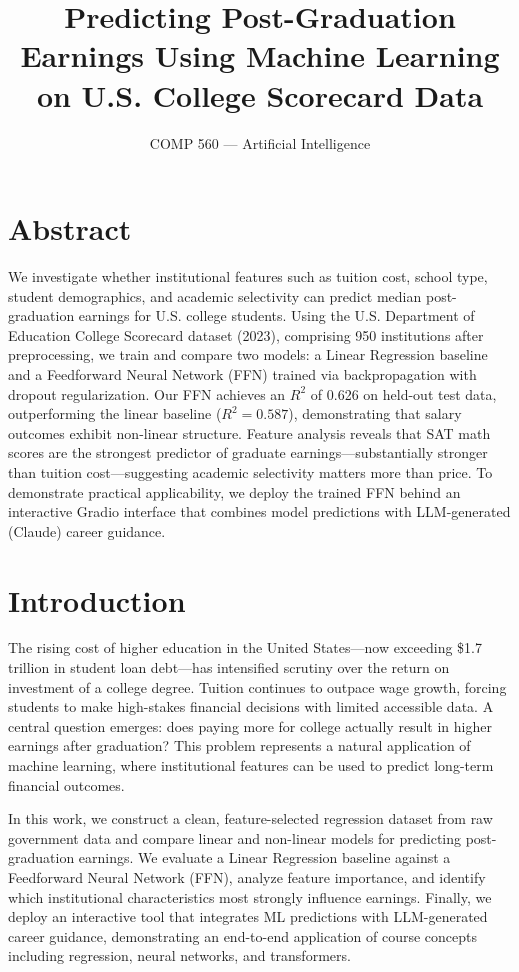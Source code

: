 \documentclass[11pt]{article}
\title{Predicting Post-Graduation Earnings Using Machine Learning on U.S. College Scorecard Data}
\author{COMP 560 — Artificial Intelligence}
\date{}
\begin{document}
\maketitle

\onehalfspacing

\section*{Abstract}

We investigate whether institutional features such as tuition cost, school type, student demographics, and academic selectivity can predict median post-graduation earnings for U.S. college students. Using the U.S. Department of Education College Scorecard dataset (2023), comprising 950 institutions after preprocessing, we train and compare two models: a Linear Regression baseline and a Feedforward Neural Network (FFN) trained via backpropagation with dropout regularization. Our FFN achieves an $R^2$ of 0.626 on held-out test data, outperforming the linear baseline ($R^2 = 0.587$), demonstrating that salary outcomes exhibit non-linear structure. Feature analysis reveals that SAT math scores are the strongest predictor of graduate earnings—substantially stronger than tuition cost—suggesting academic selectivity matters more than price. To demonstrate practical applicability, we deploy the trained FFN behind an interactive Gradio interface that combines model predictions with LLM-generated (Claude) career guidance.

\section{Introduction}

The rising cost of higher education in the United States—now exceeding \$1.7 trillion in student loan debt—has intensified scrutiny over the return on investment of a college degree. Tuition continues to outpace wage growth, forcing students to make high-stakes financial decisions with limited accessible data. A central question emerges: does paying more for college actually result in higher earnings after graduation? This problem represents a natural application of machine learning, where institutional features can be used to predict long-term financial outcomes.

In this work, we construct a clean, feature-selected regression dataset from raw government data and compare linear and non-linear models for predicting post-graduation earnings. We evaluate a Linear Regression baseline against a Feedforward Neural Network (FFN), analyze feature importance, and identify which institutional characteristics most strongly influence earnings. Finally, we deploy an interactive tool that integrates ML predictions with LLM-generated career guidance, demonstrating an end-to-end application of course concepts including regression, neural networks, and transformers.
\end{document}
